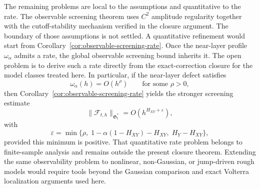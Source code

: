 \documentclass[11pt,a4paper]{amsart}
\theoremstyle{plain}
\theoremstyle{definition}
\theoremstyle{remark}
\begin{document}
The remaining problems are local to the assumptions and quantitative to the rate.  The observable
screening theorem uses \(C^2\) amplitude regularity together with the cutoff-stability mechanism
verified in the closure argument.  The boundary of those assumptions is not settled.  A quantitative
refinement would start from Corollary~\ref{cor:observable-screening-rate}.  Once the near-layer
profile \(\omega_\alpha\) admits a rate, the global observable screening bound inherits it.  The
open problem is to derive such a rate directly from the exact-correction closure for the model
classes treated here.  In particular, if the near-layer defect satisfies
\[
\omega_\alpha(h)=O(h^\rho)
\qquad\text{for some }\rho>0,
\]
then Corollary~\ref{cor:observable-screening-rate} yields the stronger screening estimate
\[
\|\mathcal F_{t,h}\|_{\mathfrak G_t^*}
=
O(h^{H_{XY}+\varepsilon}),
\]
with
\[
\varepsilon
=
\min\!\bigl\{\rho,\;1-\alpha(1-H_{XY})-H_{XY},\;H_Y-H_{XY}\bigr\},
\]
provided this minimum is positive.  That quantitative rate problem belongs to finite-sample
analysis and remains outside the present closure theorem.  Extending the same observability problem
to nonlinear, non-Gaussian, or jump-driven rough models would require tools beyond the Gaussian
comparison and exact Volterra localization arguments used here.



\end{document}
